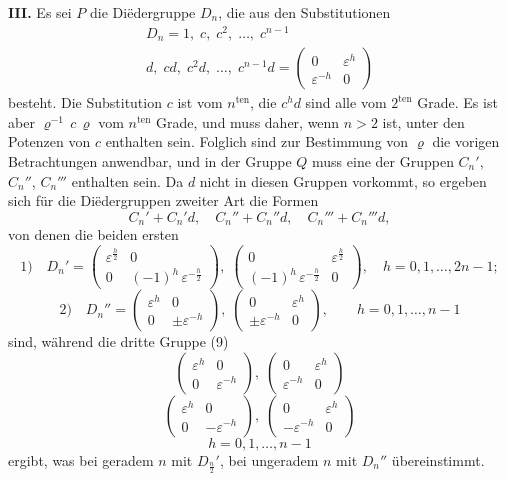 \documentclass[12pt,a4paper]{article}
\begin{document}
\medskip\noindent
\textbf{III.} Es sei $P$ die Diëdergruppe $D_{n}$, die aus den Substitutionen
\begin{equation}\label{eq:62.8}
\tag{8}
\begin{aligned}
D_{n} = 1,\; c,\; c^{2},\; \ldots,\; c^{n-1}\\
d,\; cd,\; c^{2}d,\; \ldots,\; c^{n-1}d = \begin{pmatrix}0&\varepsilon^{h}\\\varepsilon^{-h}&0\end{pmatrix}
\end{aligned}
\end{equation}
besteht. Die Substitution $c$ ist vom $n^{\text{ten}}$, die $c^{h}d$ sind alle vom $2^{\text{ten}}$ Grade. Es ist aber $\varrho^{-1}\,c\,\varrho$ vom $n^{\text{ten}}$ Grade, und muss daher, wenn $n > 2$ ist, unter den Potenzen von $c$ enthalten sein. Folglich sind zur Bestimmung von $\varrho$ die vorigen Betrachtungen anwendbar, und in der Gruppe $Q$ muss eine der Gruppen $C_{n}'$, $C_{n}''$, $C_{n}'''$ enthalten sein. Da $d$ nicht in diesen Gruppen vorkommt, so ergeben sich für die Diëdergruppen zweiter Art die Formen
\begin{equation}\label{eq:62.9}
\tag{9}
C_{n}' + C_{n}'d,\quad C_{n}'' + C_{n}''d,\quad C_{n}''' + C_{n}'''d,
\end{equation}
von denen die beiden ersten
\[
\text{1)}\quad
D_{n}' =
\begin{pmatrix}\varepsilon^{\frac{h}{2}}&0\\0&(-1)^{h}\,\varepsilon^{-\frac{h}{2}}\end{pmatrix},\;
\begin{pmatrix}0&\varepsilon^{\frac{h}{2}}\\(-1)^{h}\,\varepsilon^{-\frac{h}{2}}&0\end{pmatrix},\quad
h = 0,1,\ldots,2n-1;
\]
\[
\text{2)}\quad
D_{n}'' =
\begin{pmatrix}\varepsilon^{h}&0\\0&\pm\varepsilon^{-h}\end{pmatrix},\;
\begin{pmatrix}0&\varepsilon^{h}\\\pm\varepsilon^{-h}&0\end{pmatrix},\qquad
h = 0,1,\ldots,n-1
\]
sind, während die dritte Gruppe (9)
\[
\begin{pmatrix}\varepsilon^{h}&0\\0&\varepsilon^{-h}\end{pmatrix},\;
\begin{pmatrix}0&\varepsilon^{h}\\\varepsilon^{-h}&0\end{pmatrix}
\]
\[
\begin{pmatrix}\varepsilon^{h}&0\\0&-\varepsilon^{-h}\end{pmatrix},\;
\begin{pmatrix}0&\varepsilon^{h}\\-\varepsilon^{-h}&0\end{pmatrix}
\]
\[
h = 0,1,\ldots,n-1
\]
ergibt, was bei geradem $n$ mit $D_{\frac{n}{2}}'$, bei ungeradem $n$ mit $D_{n}''$ übereinstimmt.
\end{document}
